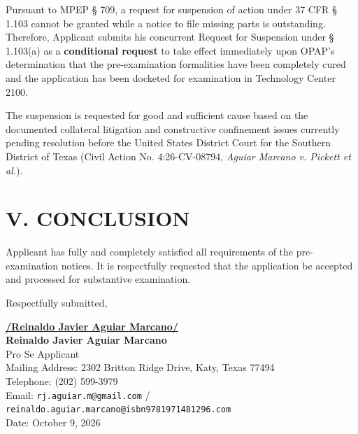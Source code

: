 \documentclass[11pt,letterpaper]{article}
\begin{document}
Pursuant to MPEP \S{} 709, a request for suspension of action under 37 CFR \S{} 1.103 cannot be granted while a notice to file missing parts is outstanding. Therefore, Applicant submits his concurrent Request for Suspension under \S{} 1.103(a) as a \textbf{conditional request} to take effect immediately upon OPAP's determination that the pre-examination formalities have been completely cured and the application has been docketed for examination in Technology Center 2100.

The suspension is requested for good and sufficient cause based on the documented collateral litigation and constructive confinement issues currently pending resolution before the United States District Court for the Southern District of Texas (Civil Action No. 4:26-CV-08794, \textit{Aguiar Marcano v. Pickett et al.}).

\section*{V. CONCLUSION}

Applicant has fully and completely satisfied all requirements of the pre-examination notices. It is respectfully requested that the application be accepted and processed for substantive examination.

\vspace{0.8cm}
\begin{singlespace}
\noindent Respectfully submitted, \par\vspace{1.5cm}
\underline{\textbf{/Reinaldo Javier Aguiar Marcano/}} \\
\textbf{Reinaldo Javier Aguiar Marcano} \\
Pro Se Applicant \\
Mailing Address: 2302 Britton Ridge Drive, Katy, Texas 77494 \\
Telephone: (202) 599-3979 \\
Email: \texttt{rj.aguiar.m@gmail.com} / \texttt{reinaldo.aguiar.marcano@isbn9781971481296.com} \\
Date: October 9, 2026
\end{singlespace}
\end{document}
